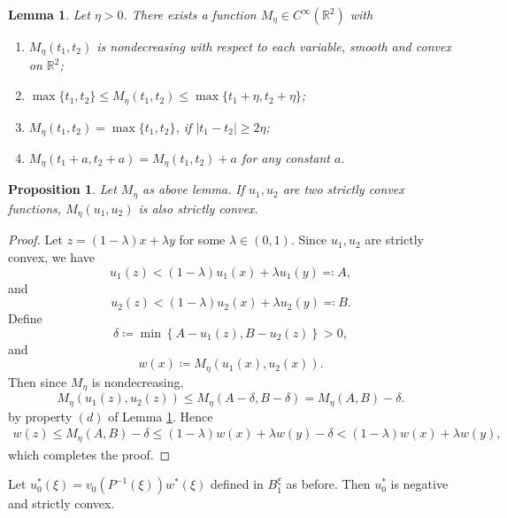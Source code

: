 \documentclass[reqno]{amsart}
\newtheorem{lemma}[theorem]{Lemma}
\newtheorem{proposition}[theorem]{Proposition}
\theoremstyle{remark}
\theoremstyle{definition}
\numberwithin{equation}{section}
\begin{document}
\begin{lemma}\label{gluing lemma}
    Let $\eta>0$. There exists a function $M_{\eta} \in C^{\infty}(\mathbb{R}^2)$ with 
    \begin{enumerate}[label=\text{(\alph*)}]
        \item $M_{\eta}(t_1, t_2)$ is nondecreasing with respect to each variable, smooth and convex on $\mathbb{R}^2$;
        \item $\max\{t_1, t_2\} \leqslant M_{\eta}(t_1, t_2) \leqslant \max\{t_1+\eta, t_2+\eta\}$;
        \item $M_{\eta}(t_1, t_2) = \max\{t_1, t_2\}$, if $|t_1 - t_2| \geqslant 2\eta$;
        \item $M_{\eta}(t_1 + a, t_2 + a) = M_{\eta}(t_1, t_2) + a$ for any constant $a$.  
    \end{enumerate}
\end{lemma}

\begin{proposition}
    Let $M_\eta$ as above lemma. If $u_1, u_2$ are two strictly convex functions, $M_{\eta}(u_1, u_2)$ is also strictly convex.
\end{proposition}
\begin{proof}
    Let $z = (1-\lambda) x + \lambda y$ for some $\lambda \in (0, 1)$. Since $u_1, u_2$ are strictly convex, we have
    \[
    u_1(z) < (1-\lambda) u_1(x) + \lambda u_1(y) \eqqcolon A,
    \]
    and
    \[
    u_2(z) < (1-\lambda) u_2(x) + \lambda u_2(y) \eqqcolon B.
    \]
    Define
    \[
    \delta \coloneqq \min \left\{ A - u_1(z), B - u_2(z) \right\} > 0,
    \]
    and 
    \[
    w(x) \coloneqq M_{\eta}(u_1(x), u_2(x)).
    \]
    Then since $M_\eta$ is nondecreasing, 
    \[
    M_{\eta}(u_1(z), u_2(z)) \leqslant M_{\eta}(A-\delta, B-\delta) = M_{\eta}(A, B)-\delta.
    \]
    by property $(d)$ of Lemma \ref{gluing lemma}. Hence
    \begin{align*}
        w(z) \leqslant M_{\eta}(A, B)-\delta \leqslant (1-\lambda) w(x) + \lambda w(y) - \delta < (1-\lambda) w(x) + \lambda w(y),
    \end{align*}
    which completes the proof.
\end{proof}

Let $u^*_0(\xi) = v_0(P^{-1}(\xi))w^*(\xi)$ defined in $B_1^{\xi}$ as before. Then $u^*_0$ is negative and strictly convex. 
\end{document}
